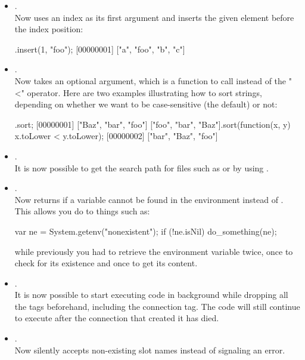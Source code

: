 \begin{itemize}
\item {}.\\
  Now uses an index as its first argument and inserts the given element
  before the index position:

\begin{urbiscript}
["a", "b", "c"].insert(1, "foo");
[00000001] ["a", "foo", "b", "c"]
\end{urbiscript}

\item {}.\\
  Now takes an optional argument, which is a function to call instead of the
  "<" operator. Here are two examples illustrating how to sort strings,
  depending on whether we want to be case-sensitive (the default) or not:

\begin{urbiscript}
.sort;
[00000001] ["Baz", "bar", "foo"]
["foo", "bar", "Baz"].sort(function(x, y) {x.toLower < y.toLower});
[00000002] ["bar", "Baz", "foo"]
\end{urbiscript}

\item {}.\\
  It is now possible to get the search path for files such as 
  or  by using .

\item {}.\\
  Now returns  if a variable cannot be found in the
  environment instead of . This allows you do to things such
  as:

\begin{urbiscript}
var ne = System.getenv("nonexistent");
if (!ne.isNil) do_something(ne);
\end{urbiscript}

  \noindent
  while previously you had to retrieve the environment variable twice, once
  to check for its existence and once to get its content.

\item {}.\\
  It is now possible to start executing code in background while dropping
  all the tags beforehand, including the connection tag. The code will still
  continue to execute after the connection that created it has died.

\item {}.\\
  Now silently accepts non-existing slot names instead of signaling an
  error.


\end{itemize}
